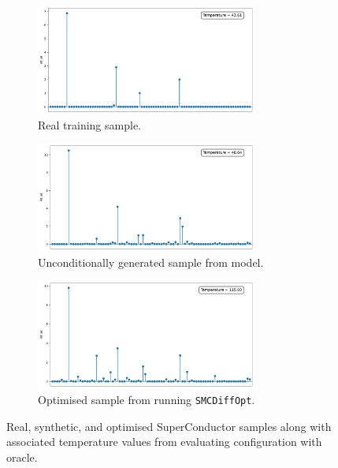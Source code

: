 \begin{figure}[htbp]
    \centering
    \begin{subfigure}[b]{\textwidth}
      \centering
      \includegraphics[width=0.8\textwidth]{assets/bb-real-sample.pdf}
      \caption{Real training sample.}
      \label{fig:bb-real}
    \end{subfigure}
    \begin{subfigure}[b]{\textwidth}
      \centering
      \includegraphics[width=0.8\textwidth]{assets/bb-unconditional-sample.pdf}
      \caption{Unconditionally generated sample from model.}
      \label{fig:bb-unconditional}
    \end{subfigure}
    \begin{subfigure}[b]{\textwidth}
        \centering
        \includegraphics[width=0.8\textwidth]{assets/bb-optimised-sample.pdf}
        \caption{Optimised sample from running \texttt{SMCDiffOpt}.}
        \label{fig:bb-optimised}
      \end{subfigure}
    \caption{Real, synthetic, and optimised SuperConductor samples along with associated
    temperature values from evaluating configuration with oracle.}
    \label{fig:bb-samples}
\end{figure}

